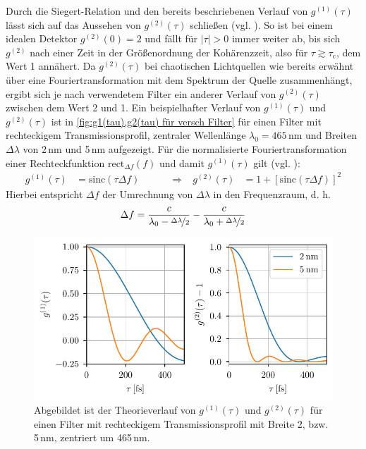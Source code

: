 Durch die Siegert-Relation und den bereits beschriebenen Verlauf von $g^{(1)}(\tau)$ lässt sich auf das Aussehen von $g^{(2)}(\tau)$ schließen (vgl. \cite[Kap. 6.3]{foxQuantumOpticsIntroduction2006}). 
So ist bei einem idealen Detektor $g^{(2)}(0)=2$ und fällt für $|\tau|>0$ immer weiter ab, bis sich $g^{(2)}$ nach einer Zeit in der Größenordnung der Kohärenzzeit, also für $\tau\gtrsim\tau_{\mathrm{c}}$, dem Wert 1 annähert. 
Da $g^{(2)}(\tau)$ bei chaotischen Lichtquellen wie bereits erwähnt über eine Fouriertransformation mit dem Spektrum der Quelle zusammenhängt, ergibt sich je nach verwendetem Filter ein anderer Verlauf von $g^{(2)}(\tau)$ zwischen dem Wert 2 und 1. 
Ein beispielhafter Verlauf von $g^{(1)}(\tau)$ und $g^{(2)}(\tau)$ ist in \autoref{fig:g1(tau),g2(tau) für versch Filter} für einen Filter mit rechteckigem Transmissionsprofil, zentraler Wellenlänge $\lambda_0 = 465\,\mathrm{nm}$ und Breiten $\Delta\lambda$ von 2\,nm und 5\,nm aufgezeigt. 
Für die normalisierte Fouriertransformation einer Rechteckfunktion $\mathrm{rect}_{\Delta f}\left(f\right)$ und damit $g^{(1)}(\tau)$ gilt (vgl. \cite[Kap. 3.2]{wangIntroductionOrthogonalTransforms2012}):
\begin{align}
    g^{(1)}(\tau) &= \mathrm{sinc}\left(\tau\Delta f\right) \quad\quad\quad \Rightarrow& g^{(2)}(\tau) &= 1+ \left[\mathrm{sinc}\left(\tau\Delta f\right)\right]^2
\end{align}
Hierbei entspricht $\Delta f$ der Umrechnung von $\Delta\lambda$ in den Frequenzraum, d. h. 
\begin{equation}
    \Delta f = \frac{c}{\lambda_0 - \nicefrac{\Delta\lambda}{2}} - \frac{c}{\lambda_0 + \nicefrac{\Delta\lambda}{2}}
\end{equation}
\begin{figure}[h]
    \centering
    \includegraphics{images/Theorie/g1_g2_tau.pdf}
    \caption{Abgebildet ist der Theorieverlauf von $g^{(1)}(\tau)$ und $g^{(2)}(\tau)$ für einen Filter mit rechteckigem Transmissionsprofil mit Breite 2, bzw. 5\,nm, zentriert um 465\,nm.}
    \label{fig:g1(tau),g2(tau) für versch Filter}
\end{figure}

